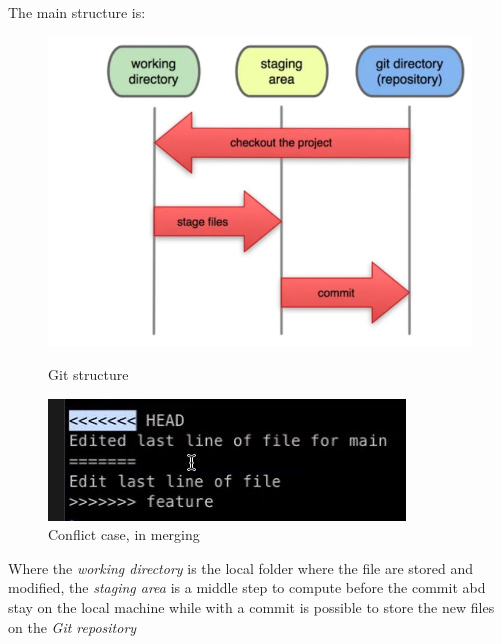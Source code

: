 \documentclass{report}
\begin{document}
The main structure is: 

\begin{figure} [H]
    \centering
    \begin{minipage}{0.5\textwidth}
        \centering
        \includegraphics[scale=0.45]{img/git1.jpg}
        \caption{Git structure}
        \label{git_str}
    \end{minipage}
    \hfill
    \begin{minipage}{0.3\textwidth}
        \centering
        \includegraphics[scale=0.8]{img/conflict.jpg}
        \caption{Conflict case, in merging}
        \label{conf}
    \end{minipage}   
\end{figure}





Where the \textit{working directory} is the local folder where the file are stored and modified, the \textit{staging area} is a middle step to compute before the commit abd stay on the local machine while with a commit is possible to store the new files on the \textit{Git repository}
\end{document}
